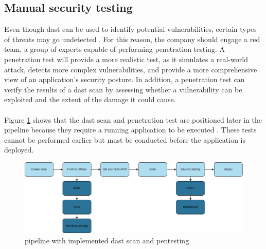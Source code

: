 \subsection{Manual security testing}
Even though \acrshort{dast} can be used to identify potential vulnerabilities, certain types of threats may go undetected \cite{dastpentesting}. For this reason, the company should engage a red team, a group of experts capable of performing penetration testing. A penetration test will provide a more realistic test, as it simulates a real-world attack, detects more complex vulnerabilities, and provide a more comprehensive view of an application's security posture. In addition, a penetration test can verify the results of a  \acrshort{dast} scan by assessing whether a vulnerability can be exploited and the extent of the damage it could cause. 
\\~\\
Figure \ref{fig: Pipeline with implemented DAST scan and pentesting} shows that the \acrshort{dast} scan and penetration test are positioned later in the \gls{pipeline} because they require a running application to be executed \cite{dastplacment}. These tests cannot be performed earlier but must be conducted before the application is deployed.
\vspace{2mm}

\begin{figure}[H]
    \centering
    \includegraphics[width=0.8\columnwidth]{Images/pipeline5.png}
    \caption{\gls{pipeline} with implemented \acrshort{dast} scan and pentesting}
    \label{fig: Pipeline with implemented DAST scan and pentesting}
\end{figure}
